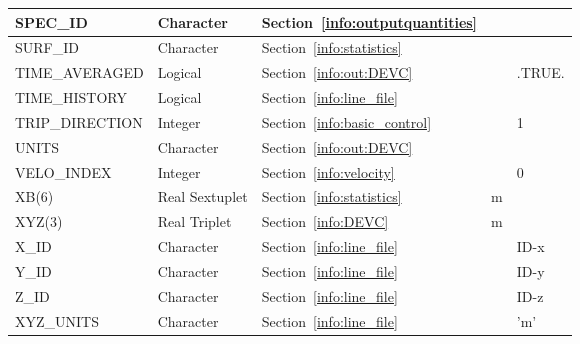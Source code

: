 \documentclass[11pt]{book}
\begin{document}
\begin{longtable}{@{\extracolsep{\fill}}|l|l|l|l|l|}
{\ct SPEC\_ID}              & Character       & Section~\ref{info:outputquantities}                             &       &               \\ \hline
{\ct SURF\_ID}              & Character       & Section~\ref{info:statistics}                                   &       &               \\ \hline
{\ct TIME\_AVERAGED}        & Logical         & Section~\ref{info:out:DEVC}                                     &       &  {\ct .TRUE.} \\ \hline
{\ct TIME\_HISTORY}         & Logical         & Section~\ref{info:line_file}                                    &       &               \\ \hline
{\ct TRIP\_DIRECTION}       & Integer         & Section~\ref{info:basic_control}                                &       &  1            \\ \hline
{\ct UNITS}                 & Character       & Section~\ref{info:out:DEVC}                                     &       &               \\ \hline
{\ct VELO\_INDEX}           & Integer         & Section~\ref{info:velocity}                                     &       &  0            \\ \hline
{\ct XB(6)}                 & Real Sextuplet  & Section~\ref{info:statistics}                                   & m     &               \\ \hline
{\ct XYZ(3)}                & Real Triplet    & Section~\ref{info:DEVC}                                         & m     &               \\ \hline
{\ct X\_ID}                 & Character       & Section~\ref{info:line_file}                                    &       &  {\ct ID-x}   \\ \hline
{\ct Y\_ID}                 & Character       & Section~\ref{info:line_file}                                    &       &  {\ct ID-y}   \\ \hline
{\ct Z\_ID}                 & Character       & Section~\ref{info:line_file}                                    &       &  {\ct ID-z}   \\ \hline
{\ct XYZ\_UNITS}            & Character       & Section~\ref{info:line_file}                                    &       &  {\ct 'm'}    \\ \hline
\end{longtable}


\vspace{\baselineskip}
\end{document}
